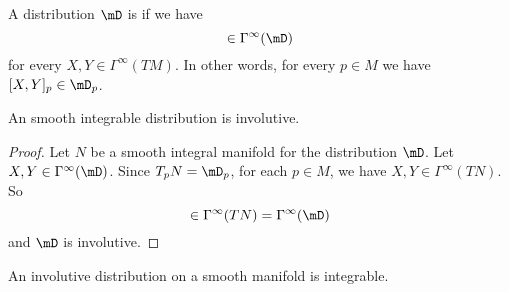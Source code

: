 \begin{definition}
	A distribution \( \mD\) is  if we have
	\begin{equation}
		[X,Y]\in \Gamma^{\infty}(\mD)
	\end{equation}
	for every \( X,Y\in \Gamma^{\infty}(TM)\). In other words, for every \( p\in M\) we have \( [X,Y]_p\in \mD_p\).
\end{definition}

\begin{proposition}     \label{PROPooDYJNooAwnaFK}
	An smooth integrable distribution is involutive.
\end{proposition}

\begin{proof}
	Let \( N\) be a smooth integral manifold for the distribution \( \mD\).  Let \( X,Y\in\Gamma^{\infty}(\mD)\). Since \( T_pN=\mD_p\), for each \( p\in M\), we have \( X,Y\in\Gamma^{\infty}(TN)\). So
	\begin{equation}
		[X,Y]\in\Gamma^{\infty}(TN)=\Gamma^{\infty}(\mD)
	\end{equation}
	and \( \mD\) is involutive.
\end{proof}

\begin{theorem}        \label{THOooDVBHooGRhuGl}
	An involutive distribution on a smooth manifold is integrable.
\end{theorem}


